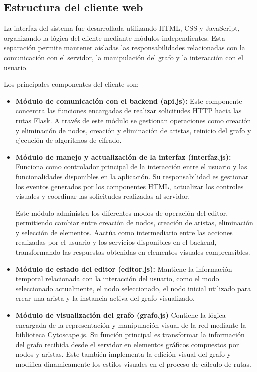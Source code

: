 \documentclass[conference]{IEEEtran}
\begin{document}
\subsection{Estructura del cliente web}
La interfaz del sistema fue desarrollada utilizando HTML, CSS y JavaScript, organizando la lógica del cliente mediante módulos independientes. Esta separación permite mantener aisladas las responsabilidades relacionadas con la comunicación con el servidor, la manipulación del grafo y la interacción con el usuario.

Los principales componentes del cliente son:

\begin{itemize}

    \item \textbf{Módulo de comunicación con el backend (api.js):}
    Este componente concentra las funciones encargadas de realizar solicitudes HTTP hacia las rutas Flask. A través de este módulo se gestionan operaciones como creación y eliminación de nodos, creación y eliminación de aristas, reinicio del grafo y ejecución de algoritmos de cifrado.

    \item \textbf{Módulo de manejo y actualización de la interfaz (interfaz.js):}
    Funciona como controlador principal de la interacción entre el usuario y las funcionalidades disponibles en la aplicación. Su responsabilidad es gestionar los eventos generados por los componentes HTML, actualizar los controles visuales y coordinar las solicitudes realizadas al servidor.
    
    Este módulo administra los diferentes modos de operación del editor, permitiendo cambiar entre creación de nodos, creación de aristas, eliminación y selección de elementos. Aactúa como intermediario entre las acciones realizadas por el usuario y los servicios disponibles en el backend, transformando las respuestas obtenidas en elementos visuales comprensibles.

    \item \textbf{Módulo de estado del editor (editor.js):}
    Mantiene la información temporal relacionada con la interacción del usuario, como el modo seleccionado actualmente, el nodo seleccionado, el nodo inicial utilizado para crear una arista y la instancia activa del grafo visualizado.

    \item \textbf{Módulo de visualización del grafo (grafo.js)}
    Contiene la lógica encargada de la representación y manipulación visual de la red mediante la biblioteca Cytoscape.js. Su función principal es transformar la información del grafo recibida desde el servidor en elementos gráficos compuestos por nodos y aristas. Este también implementa la edición visual del grafo y modifica dinamicamente los estilos visuales en el proceso de cálculo de rutas.


\end{itemize}
\end{document}
